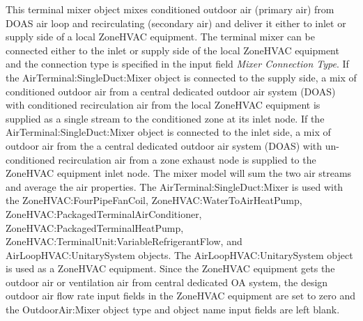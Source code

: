 This terminal mixer object mixes conditioned outdoor air (primary air) from DOAS air loop and recirculating (secondary air) and deliver it either to inlet or supply side of a local ZoneHVAC equipment. The terminal mixer can be connected either to the inlet or supply side of the local ZoneHVAC equipment and the connection type is specified in the input field \textit{Mixer Connection Type}. If the AirTerminal:SingleDuct:Mixer object is connected to the supply side, a mix of conditioned outdoor air from a central dedicated outdoor air system (DOAS) with conditioned recirculation air from the local ZoneHVAC equipment is supplied as a single stream to the conditioned zone at its inlet node. If the AirTerminal:SingleDuct:Mixer object is connected to the inlet side, a mix of outdoor air from the a central dedicated outdoor air system (DOAS) with un-conditioned recirculation air from a zone exhaust node is supplied to the ZoneHVAC equipment inlet node. The mixer model will sum the two air streams and average the air properties. The AirTerminal:SingleDuct:Mixer is used with the ZoneHVAC:FourPipeFanCoil, ZoneHVAC:WaterToAirHeatPump, ZoneHVAC:PackagedTerminalAirConditioner, ZoneHVAC:PackagedTerminalHeatPump, ZoneHVAC:TerminalUnit:VariableRefrigerantFlow, and AirLoopHVAC:UnitarySystem objects. The AirLoopHVAC:UnitarySystem object is used as a ZoneHVAC equipment. Since the ZoneHVAC equipment gets the outdoor air or ventilation air from central dedicated OA system, the design outdoor air flow rate input fields in the ZoneHVAC equipment are set to zero and the OutdoorAir:Mixer object type and object name input fields are left blank.

